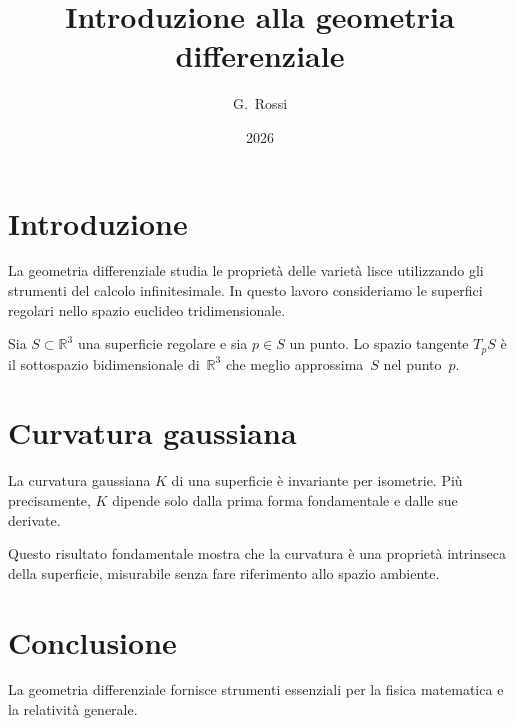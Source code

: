 \documentclass{article}
\title{Introduzione alla geometria differenziale}
\author{G.~Rossi}
\date{2026}
\begin{document}
\maketitle

\section{Introduzione}

La geometria differenziale studia le propriet\`a delle variet\`a lisce
utilizzando gli strumenti del calcolo infinitesimale.  In questo lavoro
consideriamo le superfici regolari nello spazio euclideo tridimensionale.

Sia $S \subset \mathbb{R}^3$ una superficie regolare e sia $p \in S$ un
punto.  Lo spazio tangente $T_p S$ \`e il sottospazio bidimensionale
di~$\mathbb{R}^3$ che meglio approssima~$S$ nel punto~$p$.

\section{Curvatura gaussiana}

\begin{theorem}
La curvatura gaussiana $K$ di una superficie \`e invariante per isometrie.
Pi\`u precisamente, $K$ dipende solo dalla prima forma fondamentale e dalle
sue derivate.
\end{theorem}

Questo risultato fondamentale mostra che la curvatura \`e una propriet\`a
intrinseca della superficie, misurabile senza fare riferimento allo spazio
ambiente.

\section{Conclusione}

La geometria differenziale fornisce strumenti essenziali per la fisica
matematica e la relativit\`a generale.
\end{document}
